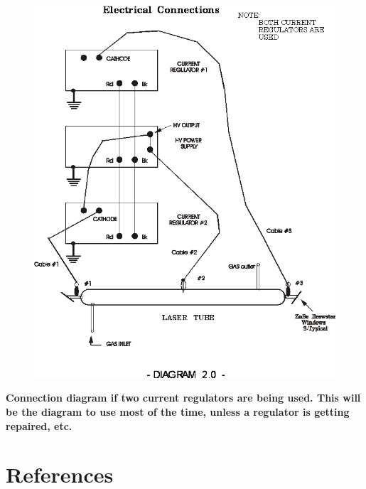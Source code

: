 \documentclass{../lab}
\begin{document}
\begin{figure}[h]
    \centering
    \href{http://experimentationlab.berkeley.edu/sites/default/files/images/CO210.gif}{\includegraphics[width=\linewidth]{images/CO210.png}}
    \caption{}
    \label{fig:CO210}
\end{figure}

\textbf{Connection diagram if two current regulators are being used. This will be the diagram to use most of the time, unless a regulator is getting repaired, etc.}

\section{References}
\end{document}
